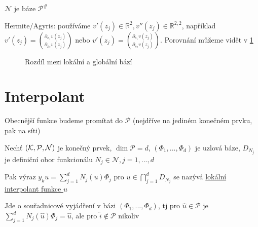 \documentclass[../main.tex]{subfiles}
\begin{document}
\begin{claim}
    $\mathcal{N}$ je báze $\mathcal{P}^\#$
\end{claim}


\begin{remark}
    Hermite/Agyris: používáme $v'(z_j)\in \mathbb{R}^2, v''(z_j)\in\mathbb{R}^{2,2}$, například $v'(z_j) = \binom{\partial_{x_1}v(z_j)}{\partial_{x_2}v(z_j)}$ nebo $v'(z_j) = \binom{\partial_{s_1}v(z_j)}{\partial_{s_2}v(z_j)}$.
    Porovnání můžeme vidět v \ref{fig:lokalnivsglobalnibaze}
    \begin{figure}[ht]
        \centering
        \caption{Rozdíl mezi lokální a globální bází}
        \label{fig:lokalnivsglobalnibaze}
    \end{figure}

\end{remark}

\section{Interpolant}
\begin{remark}
    Obecnější funkce budeme promítat do $\mathcal{P}$ (nejdříve na jediném konečném prvku, pak na síti)
\end{remark}
\begin{definition}
    Nechť $(\mathcal{K}, \mathcal{P}, \mathcal{N})$ je konečný prvek, $\dim\mathcal{P}=d$, $(\Phi_1,...,\Phi_d)$ je uzlová báze, $D_{N_j}$ je definiční obor funkcionálu $N_j\in\mathcal{N}, j = 1,...,d$
    
    Pak výraz $y_k u  = \sum_{j=1}^d N_j(u)\Phi_j$ pro $u \in \bigcap_{j=1}^d D_{N_j}$ se nazývá \underline{lokální interpolant funkce $u$}
\end{definition}

\begin{remark}
    Jde o souřadnicové vyjádření v bázi $(\Phi_1,...,\Phi_d)$, tj pro $\hat{u}\in\mathcal{P}$ je $\sum_{j=1}^d N_j(\hat{u}) \Phi_j = \hat{u}$, ale pro $\hat{i}\notin\mathcal{P}$ nikoliv
\end{remark}
\end{document}
